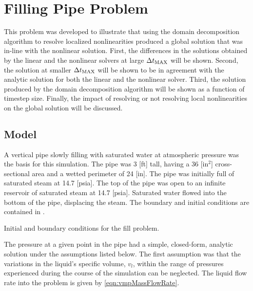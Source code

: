 
\section{Filling Pipe Problem}
\label{sect:vmp}
This problem was developed to illustrate that using the domain decomposition algorithm to resolve localized nonlinearities produced a global solution that was in-line with the nonlinear solution.
First, the differences in the solutions obtained by the linear and the nonlinear solvers at large $\dtmax{}$ will be shown.
Second, the solution at smaller $\dtmax{}$ will be shown to be in agreement with the analytic solution for both the linear and the nonlinear solver.
Third, the solution produced by the domain decomposition algorithm will be shown as a function of timestep size.
Finally, the impact of resolving or not resolving local nonlinearities on the global solution will be discussed.

\subsection{Model}
\label{subsect:vmpModel}

A vertical pipe slowly filling with saturated water at atmospheric pressure was the basis for this simulation.
The pipe was 3 [ft] tall, having a 36 [in$^{2}$] cross-sectional area and a wetted perimeter of 24 [in].
The pipe was initially full of saturated steam at 14.7 [psia].
The top of the pipe was open to an infinite reservoir of saturated steam at 14.7 [psia].
Saturated water flowed into the bottom of the pipe, displacing the steam.
The boundary and initial conditions are contained in .

\begin{table}[h!tb]
\centering
\singlespace

\caption{Initial and boundary conditions for the fill problem.}
\label{tab:vmpBCIC}
\end{table}

The pressure at a given point in the pipe had a simple, closed-form, analytic solution under the assumptions listed below.
The first assumption was that the variations in the liquid's specific volume, $v_{l}$, within the range of pressures experienced during the course of the simulation can be neglected.
The liquid flow rate into the problem is given by \eqref{eqn:vmpMassFlowRate}.

